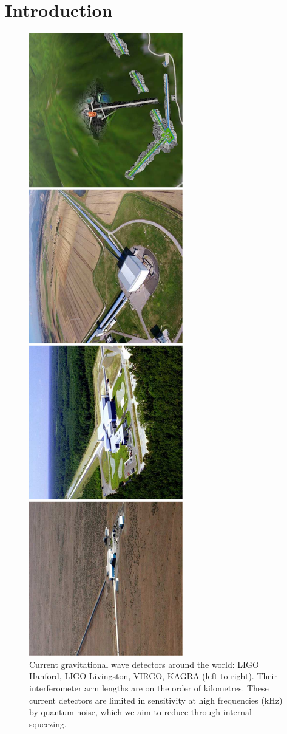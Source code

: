 \documentclass[aps,pra,superscriptaddress,reprint,nofootinbib]{revtex4-1}
\begin{document}
\maketitle

\section{Introduction}
\label{sec:introduction}

\begin{figure}[ht!]
	\begin{center}
	\includegraphics[height=.8\textwidth,angle=-90]{figures/gwo_ifos-pictures.pdf}
	\end{center}
	\caption{Current gravitational wave detectors around the world: LIGO Hanford, LIGO Livingston, VIRGO, KAGRA (left to right). Their interferometer arm lengths are on the order of kilometres. These current detectors are limited in sensitivity at high frequencies (kHz) by quantum noise, which we aim to reduce through internal squeezing.}
	\label{fig:gw_ifos}
\end{figure}
\end{document}
